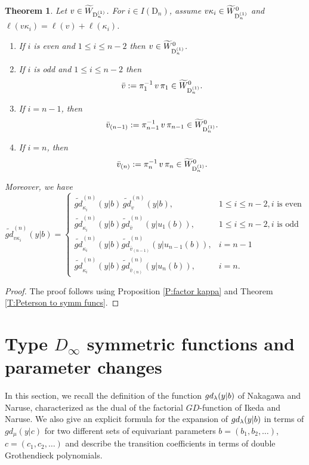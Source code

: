 \documentclass[a4paper]{amsart}
\newtheorem{thm}{Theorem}[section]
\theoremstyle{remark}
\numberwithin{equation}{section}
\begin{document}
 \begin{thm}\label{thm_fac_type_D}
    Let \(v \in \widetilde{W}_{\mathrm{D}_{n}^{(1)}}\). For $i\in I(\mathrm{D}_n)$, assume \(v\kappa_i \in \widetilde{W}_{\mathrm{D}_{n}^{(1)}}^0\) and 
\(\ell(v\kappa_i) = \ell(v) + \ell(\kappa_i)\).
\begin{enumerate}
    \item If $i$ is even and $1\leq i\leq n-2$ then  \(v \in \widetilde{W}_{\mathrm{D}_{n}^{(1)}}^0\).\\
    \item If $i$ is odd and $1\leq i\leq n-2$ then 
\[
\bar{v} := \pi_1^{-1} \, v \, \pi_1 \in \widetilde{W}_{\mathrm{D}_{n}^{(1)}}^0.
\]
\item If $i=n-1$, then 
\[
\bar{v}_{(n-1)} := \pi_{n-1}^{-1} \, v \, \pi_{n-1} \in \widetilde{W}_{\mathrm{D}_{n}^{(1)}}^0.
\]
\item If $i=n$, then 
\[
\bar{v}_{(n)} := \pi_{n}^{-1} \, v \, \pi_{n} \in \widetilde{W}_{\mathrm{D}_{n}^{(1)}}^0.
\]
\end{enumerate}

Moreover, we have
\begin{equation}
\widetilde{gd}^{(n)}_{v\kappa_i}(y| b) =
\begin{cases}
\widetilde{gd}^{(n)}_{\kappa_i}(y| b)\,
\widetilde{gd}^{(n)}_{v}(y| b), & 1 \le i \le n-2, i \text{ is even} \\
\widetilde{gd}^{(n)}_{\kappa_i}(y| b)
\widetilde{gd}^{(n)}_{\bar{v}}(y| u_1(b)), & 1 \le i \le n-2, i \text{ is odd}\\
\widetilde{gd}^{(n)}_{\kappa_i}(y| b)
\widetilde{gd}^{(n)}_{\bar{v}_{(n-1)}}(y| u_{n-1}(b)), & i= n-1\\
\widetilde{gd}^{(n)}_{\kappa_i}(y| b)
\widetilde{gd}^{(n)}_{\bar{v}_{(n)}}(y| u_{n}(b)), & i= n.
\end{cases}
\end{equation}
\end{thm}
\begin{proof}
The proof follows using Proposition \ref{P:factor kappa} and Theorem \ref{T:Peterson to symm funcs}.    
\end{proof}





\section{
{Type \(D_\infty\) symmetric functions and parameter changes}
}
\label{subsec_D_infty}
In this section, we recall the definition of the function $gd_\lambda(y| b)$ of Nakagawa and Naruse, characterized as the dual of the factorial $GD$-function of Ikeda and Naruse. We also give an explicit formula for the expansion of $gd_\lambda(y| b)$ in terms of $gd_\mu(y| c)$ for two different sets of equivariant parameters $b=(b_1,b_2,\dots)$, $c=(c_1,c_2,\dots)$ and describe the transition coefficients in terms of double Grothendieck polynomials.
\end{document}
